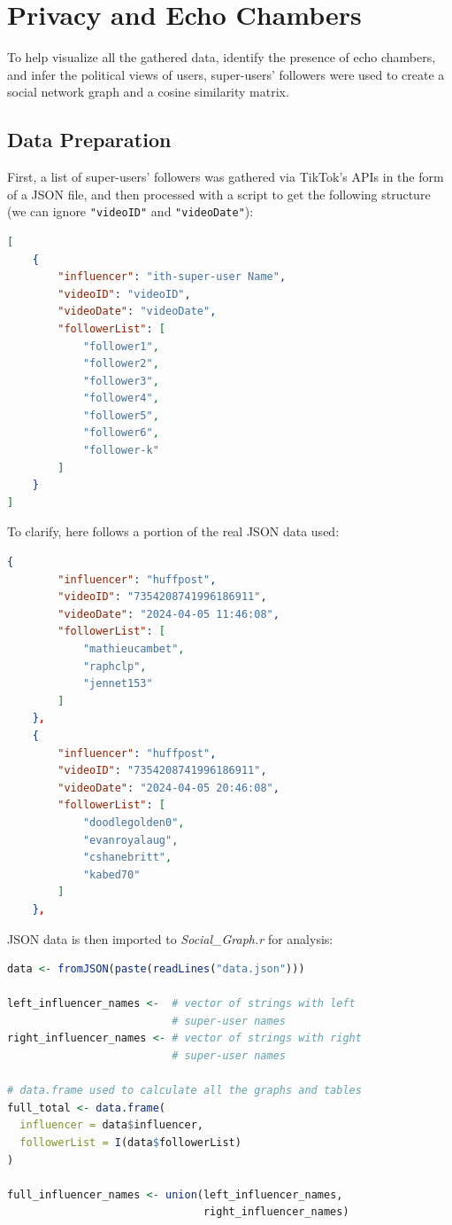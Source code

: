 \section{Privacy and Echo Chambers}

To help visualize all the gathered data, identify the presence of echo chambers, and infer the political views of users, super-users' followers were used to create a social network graph and a cosine similarity matrix.

\subsection{Data Preparation}

First, a list of super-users' followers was gathered via TikTok's APIs in the form of a JSON file, and then processed with a script to get the following structure (we can ignore \verb+"videoID"+ and \verb+"videoDate"+):

\begin{lstlisting}[language=json]
[
    {
        "influencer": "ith-super-user Name",
        "videoID": "videoID",
        "videoDate": "videoDate",
        "followerList": [
            "follower1",
            "follower2",
            "follower3",
            "follower4",
            "follower5",
            "follower6",
            "follower-k"
        ]
    }
]
\end{lstlisting}

To clarify, here follows a portion of the real JSON data used:

\begin{lstlisting}[language=json]
    {
        "influencer": "huffpost",
        "videoID": "7354208741996186911",
        "videoDate": "2024-04-05 11:46:08",
        "followerList": [
            "mathieucambet",
            "raphclp",
            "jennet153"
        ]
    },
    {
        "influencer": "huffpost",
        "videoID": "7354208741996186911",
        "videoDate": "2024-04-05 20:46:08",
        "followerList": [
            "doodlegolden0",
            "evanroyalaug",
            "cshanebritt",
            "kabed70"
        ]
    },
\end{lstlisting}

JSON data is then imported to \textit{Social\_Graph.r} for analysis:

\begin{lstlisting}[language=R]
data <- fromJSON(paste(readLines("data.json")))

left_influencer_names <-  # vector of strings with left 
                          # super-user names
right_influencer_names <- # vector of strings with right 
                          # super-user names

# data.frame used to calculate all the graphs and tables
full_total <- data.frame(
  influencer = data$influencer,
  followerList = I(data$followerList)
)

full_influencer_names <- union(left_influencer_names, 
                               right_influencer_names)
\end{lstlisting}

